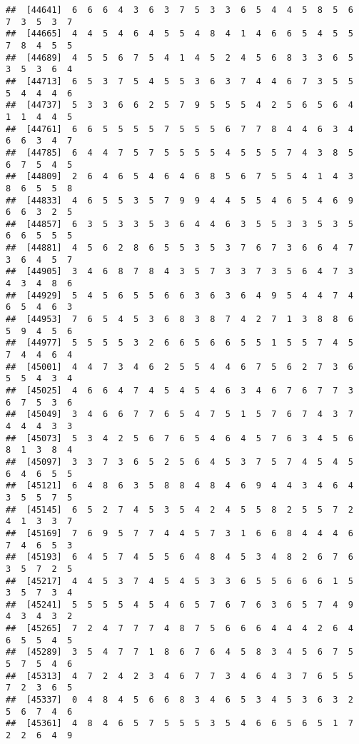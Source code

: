 \documentclass[
]{book}
\begin{document}
\begin{verbatim}
##  [44641]  6  6  6  4  3  6  3  7  5  3  3  6  5  4  4  5  8  5  6  7  3  5  3  7
##  [44665]  4  4  5  4  6  4  5  5  4  8  4  1  4  6  6  5  4  5  5  7  8  4  5  5
##  [44689]  4  5  5  6  7  5  4  1  4  5  2  4  5  6  8  3  3  6  5  3  5  3  6  4
##  [44713]  6  5  3  7  5  4  5  5  3  6  3  7  4  4  6  7  3  5  5  5  4  4  4  6
##  [44737]  5  3  3  6  6  2  5  7  9  5  5  5  4  2  5  6  5  6  4  1  1  4  4  5
##  [44761]  6  6  5  5  5  5  7  5  5  5  6  7  7  8  4  4  6  3  4  6  6  3  4  7
##  [44785]  6  4  4  7  5  7  5  5  5  5  4  5  5  5  7  4  3  8  5  6  7  5  4  5
##  [44809]  2  6  4  6  5  4  6  4  6  8  5  6  7  5  5  4  1  4  3  8  6  5  5  8
##  [44833]  4  6  5  5  3  5  7  9  9  4  4  5  5  4  6  5  4  6  9  6  6  3  2  5
##  [44857]  6  3  5  3  3  5  3  6  4  4  6  3  5  5  3  3  5  3  5  6  6  5  5  5
##  [44881]  4  5  6  2  8  6  5  5  3  5  3  7  6  7  3  6  6  4  7  3  6  4  5  7
##  [44905]  3  4  6  8  7  8  4  3  5  7  3  3  7  3  5  6  4  7  3  4  3  4  8  6
##  [44929]  5  4  5  6  5  5  6  6  3  6  3  6  4  9  5  4  4  7  4  6  5  4  6  3
##  [44953]  7  6  5  4  5  3  6  8  3  8  7  4  2  7  1  3  8  8  6  5  9  4  5  6
##  [44977]  5  5  5  5  3  2  6  6  5  6  6  5  5  1  5  5  7  4  5  7  4  4  6  4
##  [45001]  4  4  7  3  4  6  2  5  5  4  4  6  7  5  6  2  7  3  6  5  5  4  3  4
##  [45025]  4  6  6  4  7  4  5  4  5  4  6  3  4  6  7  6  7  7  3  6  7  5  3  6
##  [45049]  3  4  6  6  7  7  6  5  4  7  5  1  5  7  6  7  4  3  7  4  4  4  3  3
##  [45073]  5  3  4  2  5  6  7  6  5  4  6  4  5  7  6  3  4  5  6  8  1  3  8  4
##  [45097]  3  3  7  3  6  5  2  5  6  4  5  3  7  5  7  4  5  4  5  6  4  6  5  5
##  [45121]  6  4  8  6  3  5  8  8  4  8  4  6  9  4  4  3  4  6  4  3  5  5  7  5
##  [45145]  6  5  2  7  4  5  3  5  4  2  4  5  5  8  2  5  5  7  2  4  1  3  3  7
##  [45169]  7  6  9  5  7  7  4  4  5  7  3  1  6  6  8  4  4  4  6  7  4  6  5  3
##  [45193]  6  4  5  7  4  5  5  6  4  8  4  5  3  4  8  2  6  7  6  3  5  7  2  5
##  [45217]  4  4  5  3  7  4  5  4  5  3  3  6  5  5  6  6  6  1  5  3  5  7  3  4
##  [45241]  5  5  5  5  4  5  4  6  5  7  6  7  6  3  6  5  7  4  9  4  3  4  3  2
##  [45265]  7  2  4  7  7  7  4  8  7  5  6  6  6  4  4  4  2  6  4  6  5  5  4  5
##  [45289]  3  5  4  7  7  1  8  6  7  6  4  5  8  3  4  5  6  7  5  5  7  5  4  6
##  [45313]  4  7  2  4  2  3  4  6  7  7  3  4  6  4  3  7  6  5  5  7  2  3  6  5
##  [45337]  0  4  8  4  5  6  6  8  3  4  6  5  3  4  5  3  6  3  2  5  6  7  4  6
##  [45361]  4  8  4  6  5  7  5  5  5  3  5  4  6  6  5  6  5  1  7  2  2  6  4  9

\end{verbatim}
\end{document}
